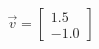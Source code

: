 \documentclass[preview]{standalone}
\begin{document}
\begin{align*}
\vec{v}=\begin{bmatrix}1.5\\-1.0\end{bmatrix}
\end{align*}
\end{document}
